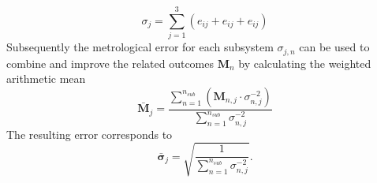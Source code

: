 \documentclass[5p,times,procedia]{elsarticle}
\begin{document}
\begin{equation}
	\sigma_j = \sum_{j=1}^{3} \left( e_{ij} + e_{ij} + e_{ij}\right)
\end{equation}
%
Subsequently the metrological error for each subsystem $\sigma_{j,n}$ can be used to combine and improve the related outcomes $\mathbf{M}_n$ by calculating the weighted arithmetic mean \cite{Price1972}
\begin{equation}
	\mathbf{\bar{M}}_{j} = \frac{\sum_{n=1}^{n_{sub}} \left( \mathbf{M}_{n,j} \cdot \sigma_{n,j}^{-2} \right)}{\sum_{n=1}^{n_{sub}} \sigma_{n,j}^{-2}}
\end{equation}
The resulting error corresponds to
\begin{equation}
	\mathbf{\bar{\sigma}}_{j} = \sqrt{ \frac{1}{\sum_{n=1}^{n_{sub}} \sigma_{n,j}^{-2}} }.
	\label{eqn:sum_noise}
\end{equation}
%
%
\end{document}
